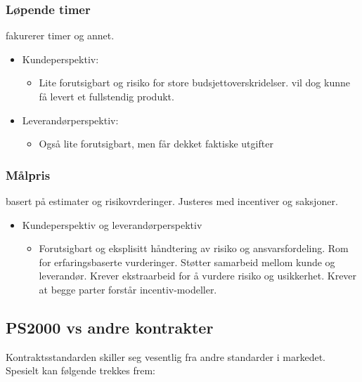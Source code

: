 \documentclass[11pt]{article}
\begin{document}
\subsubsection{Løpende timer}
\label{sec-11.2.2}

    fakurerer timer og annet.  
\begin{itemize}
\item Kundeperspektiv:

\begin{itemize}
\item Lite forutsigbart og risiko for store budsjettoverskridelser.
        vil dog kunne få levert et fullstendig produkt.
\end{itemize}

\item Leverandørperspektiv:

\begin{itemize}
\item Også lite forutsigbart, men får dekket faktiske utgifter
\end{itemize}

\end{itemize}
\subsubsection{Målpris}
\label{sec-11.2.3}

    basert på estimater og risikovrderinger. Justeres med incentiver og
    saksjoner.
\begin{itemize}
\item Kundeperspektiv og leverandørperspektiv

\begin{itemize}
\item Forutsigbart og eksplisitt håndtering av risiko og
        ansvarsfordeling. Rom for erfaringsbaserte vurderinger. Støtter samarbeid mellom kunde og
        leverandør. Krever ekstraarbeid for å vurdere risiko og usikkerhet. Krever at begge parter
        forstår incentiv-modeller.
\end{itemize}

\end{itemize}
\subsection{PS2000 vs andre kontrakter}
\label{sec-11.3}


   Kontraktsstandarden skiller seg vesentlig fra andre standarder i markedet. 
   Spesielt kan følgende trekkes frem: 
\end{document}
